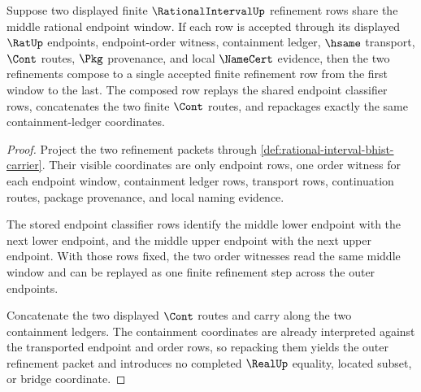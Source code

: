 \begin{theorem}
\label{thm:rational-interval-refinement-composition}
Suppose two displayed finite $\RationalIntervalUp$ refinement rows share the
middle rational endpoint window. If each row is accepted through its displayed
$\RatUp$ endpoints, endpoint-order witness, containment ledger, $\hsame$
transport, $\Cont$ routes, $\Pkg$ provenance, and local $\NameCert$ evidence,
then the two refinements compose to a single accepted finite refinement row
from the first window to the last. The composed row replays the shared
endpoint classifier rows, concatenates the two finite $\Cont$ routes, and
repackages exactly the same containment-ledger coordinates.
\end{theorem}
\begin{proof}
Project the two refinement packets through
\autoref{def:rational-interval-bhist-carrier}. Their visible coordinates are
only endpoint rows, one order witness for each endpoint window, containment
ledger rows, transport rows, continuation routes, package provenance, and
local naming evidence.

The stored endpoint classifier rows identify the middle lower endpoint with
the next lower endpoint, and the middle upper endpoint with the next upper
endpoint. With those rows fixed, the two order witnesses read the same middle
window and can be replayed as one finite refinement step across the outer
endpoints.

Concatenate the two displayed $\Cont$ routes and carry along the two
containment ledgers. The containment coordinates are already interpreted
against the transported endpoint and order rows, so repacking them yields the
outer refinement packet and introduces no completed $\RealUp$ equality,
located subset, or bridge coordinate.
\end{proof}


